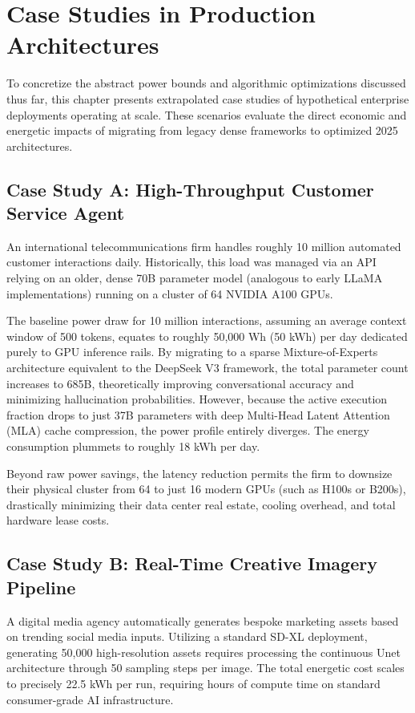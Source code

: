 \documentclass[12pt, a4paper]{report}
\begin{document}
\chapter{Case Studies in Production Architectures}
\label{ch:case_studies}

To concretize the abstract power bounds and algorithmic optimizations discussed thus far, this chapter presents extrapolated case studies of hypothetical enterprise deployments operating at scale. These scenarios evaluate the direct economic and energetic impacts of migrating from legacy dense frameworks to optimized 2025 architectures.

\section{Case Study A: High-Throughput Customer Service Agent}
An international telecommunications firm handles roughly 10 million automated customer interactions daily. Historically, this load was managed via an API relying on an older, dense 70B parameter model (analogous to early LLaMA implementations) running on a cluster of 64 NVIDIA A100 GPUs. 

The baseline power draw for 10 million interactions, assuming an average context window of 500 tokens, equates to roughly 50,000 Wh (50 kWh) per day dedicated purely to GPU inference rails. By migrating to a sparse Mixture-of-Experts architecture equivalent to the DeepSeek V3 framework, the total parameter count increases to 685B, theoretically improving conversational accuracy and minimizing hallucination probabilities. However, because the active execution fraction drops to just 37B parameters with deep Multi-Head Latent Attention (MLA) cache compression, the power profile entirely diverges. The energy consumption plummets to roughly 18 kWh per day.

Beyond raw power savings, the latency reduction permits the firm to downsize their physical cluster from 64 to just 16 modern GPUs (such as H100s or B200s), drastically minimizing their data center real estate, cooling overhead, and total hardware lease costs.

\section{Case Study B: Real-Time Creative Imagery Pipeline}
A digital media agency automatically generates bespoke marketing assets based on trending social media inputs. Utilizing a standard SD-XL deployment, generating 50,000 high-resolution assets requires processing the continuous Unet architecture through 50 sampling steps per image. The total energetic cost scales to precisely 22.5 kWh per run, requiring hours of compute time on standard consumer-grade AI infrastructure.
\end{document}
